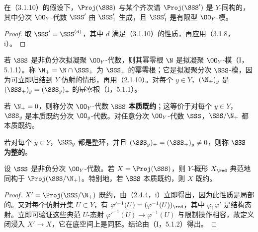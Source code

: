 在（3.1.10）的假设下，$\Proj(\SSS)$ 与某个齐次谱 $\Proj(\SSS')$ 是 $Y$-同构的，其中分次 $\OO_Y$-代数 $\SSS'$ 由 $\SSS'_1$ 生成，且 $\SSS'_1$ 是有限型 $\OO_Y$-模。
\begin{proof}
取 $\SSS'=\SSS^{(d)}$，其中 $d$ 满足（3.1.10）的性质，再应用（3.1.8，i）。
\end{proof}

若 $\SSS$ 是非负分次拟凝聚 $\OO_Y$-代数，则其幂零根 $\N$ 是拟凝聚 $\OO_Y$-模（I，5.1.1）。称 $\N_+=\N\cap\SSS_+$ 为 $\SSS_+$ 的幂零根；它是拟凝聚分次 $\SSS$-模，因为可立即归结到 $Y$ 仿射的情形，再用（2.1.10）。对每个 $y\in Y$，$(\N_+)_y$ 是 $(\SSS_+)_y=(\SSS_y)_+$ 的幂零根（I，5.1.1）。

若 $\N_+=0$，则称分次 $\OO_Y$-代数 $\SSS$ \textbf{本质既约}；这等价于对每个 $y\in Y$，$\SSS_y$ 是本质既约分次 $\OO_y$-代数。对任意分次 $\OO_Y$-代数 $\SSS$，$\SSS/\N_+$ 都本质既约。

若对每个 $y\in Y$，$\SSS_y$ 都是整环，并且 $(\SSS_y)_+=(\SSS_+)_y\ne0$，则称 $\SSS$ \textbf{为整的}。

设 $\SSS$ 是非负分次 $\OO_Y$-代数。若 $X=\Proj(\SSS)$，则 $Y$-概形 $X_{\red}$ 典范地同构于 $\Proj(\SSS/\N_+)$。特别地，若 $\SSS$ 本质既约，则 $X$ 既约。
\begin{proof}
$X'=\Proj(\SSS/\N_+)$ 既约，由（2.4.4，i）立即得出，因为此性质是局部的。又对每个仿射开集 $U\subset Y$，有 $\varphi'^{-1}(U)=(\varphi^{-1}(U))_{\red}$，其中 $\varphi,\varphi'$ 是结构态射。立即可验证这些典范 $U$-态射 $\varphi'^{-1}(U)\to\varphi^{-1}(U)$ 与限制操作相容，故定义闭浸入 $X'\to X$，它在底空间上是同胚。结论由（I，5.1.2）得出。
\end{proof}

